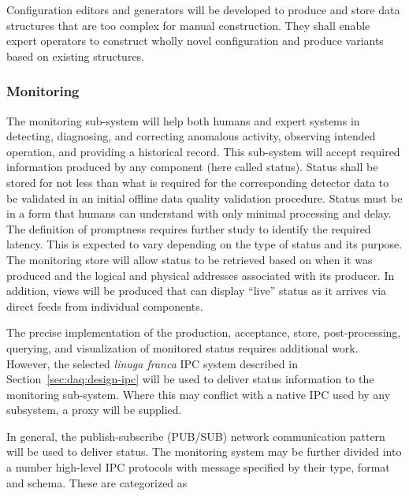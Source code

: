 Configuration editors and generators will be developed to produce and store data structures that are too complex for manual construction. 
They shall enable expert operators to construct wholly novel configuration and produce variants based on existing structures.

\subsubsection{Monitoring}
\label{sec:daq:design:ccm:monitoring}

The  monitoring sub-system will help both humans and expert systems in detecting, diagnosing, and correcting anomalous activity, observing intended operation, and providing a historical record.
This sub-system will accept required information produced by any  component (here called status).
Status shall be stored for not less than what is required for the corresponding detector data to be validated in an initial offline data quality validation procedure.
Status must be in a form that humans can understand with only minimal processing and delay. 
The definition of promptness requires further study to identify the required latency. This is expected to vary depending on the type of status and its purpose.  
The monitoring store will allow status to be retrieved based on when it was produced and the logical and physical addresses associated with its producer.
In addition, views will be produced that can display ``live'' status as it arrives via direct feeds from individual components.

The precise implementation of the production, acceptance, store, post-processing, querying, and visualization of monitored status requires additional work. 
However, the selected \textit{linuga franca} IPC system described in Section~\ref{sec:daq:design-ipc} will be used to deliver status information to the monitoring sub-system. 
Where this may conflict with a native IPC used by any subsystem, a proxy will be supplied. 

In general, the publish-subscribe (PUB/SUB) network communication pattern will be used to deliver status. 
The monitoring system may be further divided into a number high-level IPC protocols with message specified by their type, format and schema.
These are categorized as


